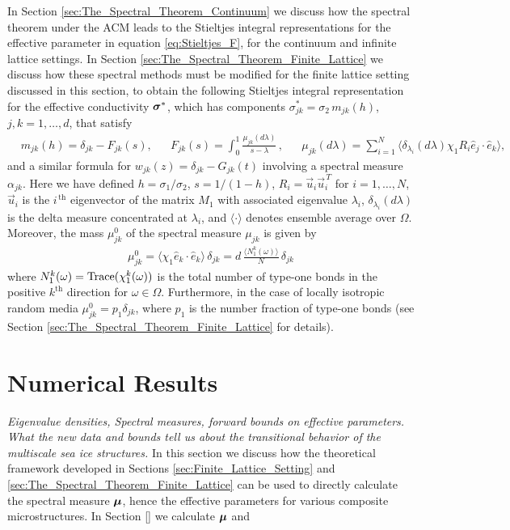 \documentclass{cmslatex}
\newcommand\bsig{\mbox{\boldmath${\sigma}$}}
\newcommand\bmu{\mbox{\boldmath${\mu}$}}
\begin{document}
In Section \ref{sec:The_Spectral_Theorem_Continuum} we discuss how the
spectral theorem under the ACM leads to the Stieltjes integral
representations for the effective parameter in equation
\eqref{eq:Stieltjes_F}, for the continuum and infinite lattice
settings. In Section \ref{sec:The_Spectral_Theorem_Finite_Lattice} we
discuss how these spectral methods must be modified for the finite
lattice setting discussed in this section, to obtain the following
Stieltjes integral representation for the effective conductivity
$\bsig^*$, which has components $\sigma^*_{jk}=\sigma_2\,m_{jk}(h)$,
$j,k=1,\ldots,d$, that satisfy
%
\begin{align}\label{eq:Stieltjes_F_Discrete}
  &m_{jk}(h)=\delta_{jk}-F_{jk}(s), %
  &&F_{jk}(s)=\int_0^1\frac{\mu_{jk}(d\lambda)}{s-\lambda}\,, %
  &&\mu_{jk}(d\lambda)=\sum_{i=1}^N\langle \delta_{\lambda_i}(d\lambda)\chi_1R_i\hat{e}_j\cdot\hat{e}_k\rangle,
\end{align}
%
and a similar formula for $w_{jk}(z)=\delta_{jk}-G_{jk}(t)$ involving a
spectral measure $\alpha_{jk}$. Here we have defined $h=\sigma_1/\sigma_2$,
$s=1/(1-h)$, $R_i=\vec{u}_i\vec{u}_i^{\,T}$ for $i=1,\ldots,N$, $\vec{u}_i$
is the $i^{\,\text{th}}$ eigenvector of the matrix $M_1$ 
with associated eigenvalue $\lambda_i$, $\delta_{\lambda_i}(d\lambda)$ is the delta measure 
concentrated at $\lambda_i$, and $\langle\cdot\rangle$ denotes ensemble average over
$\Omega$. Moreover, the mass $\mu_{jk}^0$ of the spectral measure $\mu_{jk}$ is
given by  
%
\begin{align*}
  \mu_{jk}^0=\langle\chi_1\hat{e}_k\cdot\hat{e}_k\rangle\,\delta_{jk}
       =d\,\frac{\langle N_1^k(\omega)\rangle}{N}\,\delta_{jk}       
\end{align*}
%
where $N_1^k(\omega)={\rm Trace}(\chi_1^k(\omega))$ is the total number of type-one
bonds in the positive $k^{\text{th}}$ direction for
$\omega\in\Omega$. Furthermore, in the case of locally isotropic random media
$\mu_{jk}^0=p_1\delta_{jk}$, where  $p_1$ is the number fraction of type-one
bonds (see Section \ref{sec:The_Spectral_Theorem_Finite_Lattice} for
details).  







\section{Numerical Results}\label{sec:Numerical_Results}
{\it Eigenvalue densities, Spectral measures, forward bounds on
  effective parameters. What the new data and bounds tell us about the
  transitional behavior of the multiscale sea ice structures.}
%
In this section we discuss how the theoretical framework developed in
Sections \ref{sec:Finite_Lattice_Setting} and
\ref{sec:The_Spectral_Theorem_Finite_Lattice} can be used to directly
calculate the spectral measure $\bmu$, hence the effective parameters
for various composite microstructures. In Section \ref{} we calculate
$\bmu$ and  
%
\end{document}
